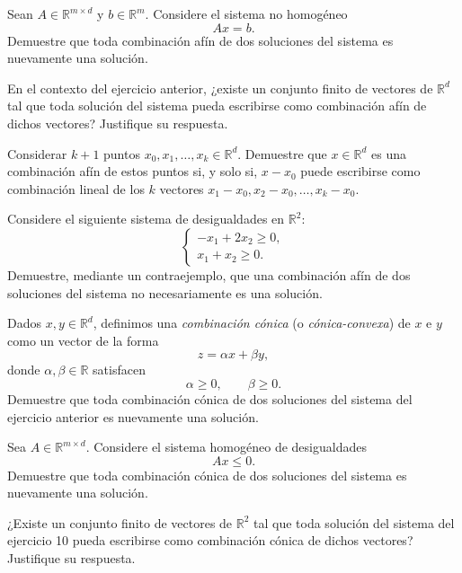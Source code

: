 \documentclass[a4paper,12pt]{article}
\begin{document}
\begin{exerciselist}
    \item Sean \(A \in \mathbb{R}^{m \times d}\) y \(b \in \mathbb{R}^m\). Considere el sistema no homogéneo
    \[
        Ax = b.
    \]
    Demuestre que toda combinación afín de dos soluciones del sistema es nuevamente una solución.

    \item En el contexto del ejercicio anterior, ¿existe un conjunto finito de vectores de \(\mathbb{R}^d\) tal que toda solución del sistema pueda escribirse como combinación afín de dichos vectores? Justifique su respuesta.
    
    \item Considerar $k+1$ puntos $x_0, x_1, \ldots, x_k \in \mathbb{R}^d$. Demuestre que $x \in \mathbb{R}^d$ es una combinación afín de estos puntos si, y solo si, $x - x_0$ puede escribirse como combinación lineal de los $k$ vectores $x_1 - x_0, x_2 - x_0, \ldots, x_k - x_0$.
    
    \item Considere el siguiente sistema de desigualdades en \(\mathbb{R}^2\):
    \[
    \begin{cases}
        -x_1 + 2x_2 \geq 0, \\
        x_1 + x_2 \geq 0.
    \end{cases}
    \]
    Demuestre, mediante un contraejemplo, que una combinación afín de dos soluciones del sistema no necesariamente es una solución.

    \item Dados \(x,y \in \mathbb{R}^d\), definimos una \emph{combinación cónica} (o \emph{cónica-convexa}) de \(x\) e \(y\) como un vector de la forma
    \[
        z = \alpha x + \beta y,
    \]
    donde \(\alpha,\beta \in \mathbb{R}\) satisfacen
    \[
        \alpha \geq 0,
        \qquad
        \beta \geq 0.
    \]
    Demuestre que toda combinación cónica de dos soluciones del sistema del ejercicio anterior es nuevamente una solución.

    \item Sea \(A \in \mathbb{R}^{m \times d}\). Considere el sistema homogéneo de desigualdades
    \[
        Ax \leq 0.
    \]
    Demuestre que toda combinación cónica de dos soluciones del sistema es nuevamente una solución.

    \item ¿Existe un conjunto finito de vectores de \(\mathbb{R}^2\) tal que toda solución del sistema del ejercicio 10 pueda escribirse como combinación cónica de dichos vectores? Justifique su respuesta.


\end{exerciselist}
\end{document}
